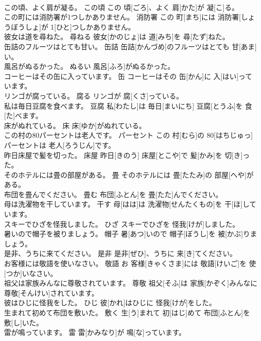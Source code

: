 \documentclass[8pt]{extreport}
\begin{document}
\begin{CJK}{UTF8}{min}
\\	この頃、よく肩が凝る。	この頃	この 頃[ごろ]、よく 肩[かた]が 凝[こ]る。	
\\	この町には消防署が1つしかありません。	消防署	この 町[まち]には 消防署[しょうぼうしょ]が 1[ひと]つしかありません。	
\\	彼女は道を尋ねた。	尋ねる	彼女[かのじょ]は 道[みち]を 尋[たず]ねた。	
\\	缶詰のフルーツはとても甘い。	缶詰	缶詰[かんづめ]のフルーツはとても 甘[あま]い。	
\\	風呂がぬるかった。	ぬるい	風呂[ふろ]がぬるかった。	
\\	コーヒーはその缶に入っています。	缶	コーヒーはその 缶[かん]に 入[はい]っています。	
\\	リンゴが腐っている。	腐る	リンゴが 腐[くさ]っている。	
\\	私は毎日豆腐を食べます。	豆腐	私[わたし]は 毎日[まいにち] 豆腐[とうふ]を 食[た]べます。	
\\	床がぬれている。	床	床[ゆか]がぬれている。	
\\	この村の80パーセントは老人です。	パーセント	この 村[むら]の 80[はちじゅっ]パーセントは 老人[ろうじん]です。	
\\	昨日床屋で髪を切った。	床屋	昨日[きのう] 床屋[とこや]で 髪[かみ]を 切[き]った。	
\\	そのホテルには畳の部屋がある。	畳	そのホテルには 畳[たたみ]の 部屋[へや]がある。	
\\	布団を畳んでください。	畳む	布団[ふとん]を 畳[たた]んでください。	
\\	母は洗濯物を干しています。	干す	母[はは]は 洗濯物[せんたくもの]を 干[ほ]しています。	
\\	スキーでひざを怪我しました。	ひざ	スキーでひざを 怪我[けが]しました。	
\\	暑いので帽子を被りましょう。	帽子	暑[あつ]いので 帽子[ぼうし]を 被[かぶ]りましょう。	
\\	是非、うちに来てください。	是非	是非[ぜひ]、うちに 来[き]てください。	
\\	お客様には敬語を使いなさい。	敬語	お 客様[きゃくさま]には 敬語[けいご]を 使[つか]いなさい。	
\\	祖父は家族みんなに尊敬されています。	尊敬	祖父[そふ]は 家族[かぞく]みんなに 尊敬[そんけい]されています。	
\\	彼はひじに怪我をした。	ひじ	彼[かれ]はひじに 怪我[けが]をした。	
\\	生まれて初めて布団を敷いた。	敷く	生[う]まれて 初[はじ]めて 布団[ふとん]を 敷[し]いた。	
\\	雷が鳴っています。	雷	雷[かみなり]が 鳴[な]っています。	

\end{CJK}
\end{document}
